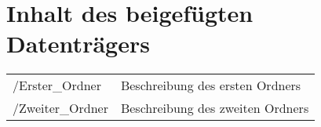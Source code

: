 \section*{Inhalt des beigefügten Datenträgers}

\begin{tabular}{ l l }
	/Erster\_Ordner & Beschreibung des ersten Ordners \\
	/Zweiter\_Ordner & Beschreibung des zweiten Ordners \\
\end{tabular}
